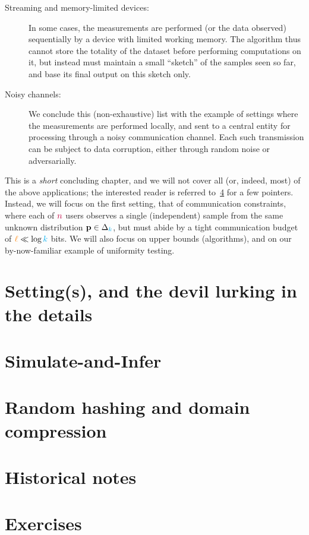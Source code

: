 \begin{description}
	\item[Streaming and memory-limited devices:] In some cases, the measurements are performed (or the data observed) sequentially by a device with limited working memory. The algorithm thus cannot store the totality of the dataset before performing computations on it, but instead must maintain a small ``sketch'' of the samples seen so far, and base its final output on this sketch only.
	\item[Noisy channels:] We conclude this (non-exhaustive) list with the example of settings where the measurements are performed locally, and sent to a central entity for processing through a noisy communication channel. Each such transmission can be subject to data corruption, either through random noise or adversarially.
\end{description}
This is a \emph{short} concluding chapter, and we will not cover all (or, indeed, most) of the above applications; the interested reader is referred to~\cref{sec:constrained:notes} for a few pointers. Instead, we will focus on the first setting, that of communication constraints, where each of ${\textcolor{purple}{n}}$ users observes a single (independent) sample from the same unknown distribution $\mathbf{p}\in\Delta_{{\textcolor{cyan}{k}}}$, but must abide by a tight communication budget of ${\textcolor{orange}{\ell}} \ll \log{\textcolor{cyan}{k}}$ bits. We will also focus on upper bounds (algorithms), and on our by-now-familiar example of uniformity testing.

\section{Setting(s), and the devil lurking in the details}
\section{Simulate-and-Infer}
  \label{sec:domain:compression}
\section{Random hashing and domain compression}
  \label{sec:domain:compression}
\section{Historical notes}
  \label{sec:constrained:notes}
\section{Exercises}